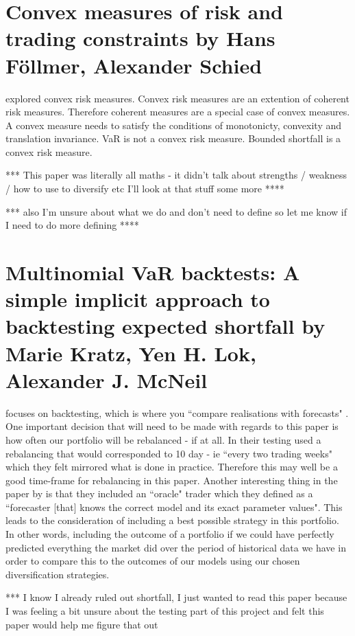 \documentclass[12pt,a4paper]{article}
\begin{document}
\section{Convex measures of risk and trading constraints by Hans F{\"o}llmer, Alexander Schied}
\label{sec:2}

\cite{Föllmer2002} explored convex risk measures. Convex risk measures are an extention of coherent risk measures. Therefore coherent measures are a special case of convex measures. A convex measure needs to satisfy the conditions of monotonicty, convexity and translation invariance.  VaR is not a convex risk measure. Bounded shortfall is a convex risk measure.

*** This paper was literally all maths - it didn't talk about strengths / weakness / how to use to diversify etc I'll look at that stuff some more ****

*** also I'm unsure about what we do and don't need to define so let me know if I need to do more defining ****

\section{Multinomial VaR backtests: A simple implicit approach to backtesting expected shortfall by Marie Kratz, Yen H. Lok, Alexander J. McNeil}
\label{sec:3}

\cite{KRATZ2018393} focuses on backtesting, which is where you ``compare realisations with forecasts" \citep{KRATZ2018393}. One important decision that will need to be made with regards to this paper is how often our portfolio will be rebalanced - if at all. In their testing\cite{KRATZ2018393} used a rebalancing that would corresponded to 10 day - ie ``every two trading weeks" which they felt mirrored what is done in practice. Therefore this may well be a good time-frame for rebalancing in this paper. Another interesting thing in the paper by \cite{KRATZ2018393} is that they included an ``oracle" trader which they defined as a ``forecaster [that] knows the correct model and its exact parameter values". This leads to the consideration of including a best possible strategy in this portfolio. In other words, including the outcome of a portfolio if we could have perfectly predicted everything the market did over the period of historical data we have in order to compare this to the outcomes of our models using our chosen diversification strategies.   




*** I know I already ruled out shortfall, I just wanted to read this paper because I was feeling a bit unsure about the testing part of this project and felt this paper would help me figure that out
\end{document}
